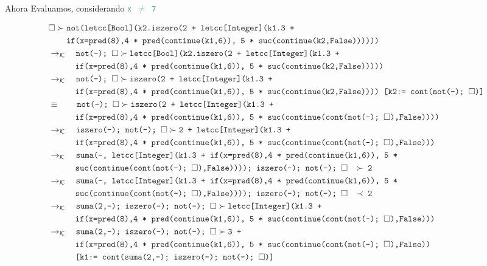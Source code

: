 \documentclass{article}
\newcommand{\tx}[1]{\textcolor{Black} {\texttt{#1}}}
\newcommand{\tp}[1]{\textcolor{CadetBlue} {\texttt{#1}}}
\newcommand{\es}{$\square$}
\newcommand{\pop}[2]{ \tx{#1} \succ \tx{#2}}
\newcommand{\kr}{\rightarrow_{\mathcal{K}} \quad}
\begin{document}
\begin{enumerate}
\begin{enumerate}
			
			Ahora 	Evaluamos, considerando \tp{x $\neq$ 7}
			
			\begin{align*}
			&\pop{\es}{not(letcc[Bool](k2.iszero(2 + letcc[Integer](k1.3 +} \\
			&\tx{\quad \quad  if(x=pred(8),4 * pred(continue(k1,6)), 5 * suc(continue(k2,False))))))}\\
			&\kr \pop{not(-); \es}{letcc[Bool](k2.iszero(2 + letcc[Integer](k1.3 +} \\
			&\tx{\quad \quad \quad if(x=pred(8),4 * pred(continue(k1,6)), 5 * suc(continue(k2,False)))))}\\
			&\kr \pop{not(-); \es}{iszero(2 + letcc[Integer](k1.3 +} \\
			&\tx{\quad \quad \quad if(x=pred(8),4 * pred(continue(k1,6)), 5 * suc(continue(k2,False)))) [k2:= cont(not(-); \es)]}\\
			&\equiv \quad \quad \pop{not(-); \es}{iszero(2 + letcc[Integer](k1.3 +} \\
			&\tx{\quad \quad \quad if(x=pred(8),4 * pred(continue(k1,6)), 5 * suc(continue(cont(not(-); \es),False))))}\\		
			&\kr \pop{iszero(-); not(-); \es}{2 + letcc[Integer](k1.3 +} \\
			&\tx{\quad \quad \quad if(x=pred(8),4 * pred(continue(k1,6)), 5 * suc(continue(cont(not(-); \es),False)))}\\
			&\kr \tx{suma(-, letcc[Integer](k1.3 + if(x=pred(8),4 * pred(continue(k1,6)), 5 *}\\ &\tx{\quad \quad \quad suc(continue(cont(not(-); \es),False)))); iszero(-); not(-); \es $\quad \succ$ 2}\\
			&\kr \tx{suma(-, letcc[Integer](k1.3 + if(x=pred(8),4 * pred(continue(k1,6)), 5 *}\\ &\tx{\quad \quad \quad suc(continue(cont(not(-); \es),False)))); iszero(-); not(-); \es $\quad \prec$ 2}\\
			&\kr \pop{suma(2,-); iszero(-); not(-); \es}{letcc[Integer](k1.3 +}\\
			&\tx{\quad \quad \quad if(x=pred(8),4 * pred(continue(k1,6)), 5 * suc(continue(cont(not(-); \es),False)))}\\
			&\kr \pop{suma(2,-); iszero(-); not(-); \es}{3 +}\\
			&\tx{\quad \quad \quad if(x=pred(8),4 * pred(continue(k1,6)), 5 * suc(continue(cont(not(-); \es),False))}\\
			&\tx{\quad \quad \quad [k1:= cont(suma(2,-); iszero(-); not(-); \es)]}\\

\end{align*}
\end{enumerate}
\end{enumerate}
\end{document}
